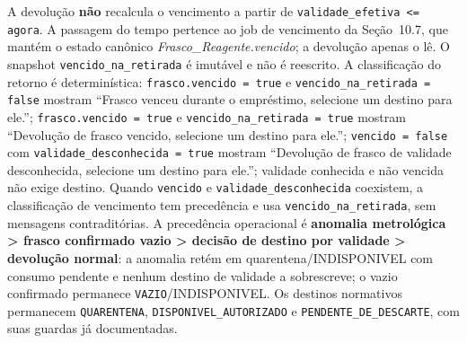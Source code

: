 \begin{regra}
A devolução \textbf{não} recalcula o vencimento a partir de \texttt{validade\_efetiva <= agora}. A passagem do tempo pertence ao job de vencimento da Seção~10.7, que mantém o estado canônico \textit{Frasco\_Reagente.vencido}; a devolução apenas o lê. O snapshot \texttt{vencido\_na\_retirada} é imutável e não é reescrito. A classificação do retorno é determinística: \texttt{frasco.vencido = true} e \texttt{vencido\_na\_retirada = false} mostram ``Frasco venceu durante o empréstimo, selecione um destino para ele.''; \texttt{frasco.vencido = true} e \texttt{vencido\_na\_retirada = true} mostram ``Devolução de frasco vencido, selecione um destino para ele.''; \texttt{vencido = false} com \texttt{validade\_desconhecida = true} mostram ``Devolução de frasco de validade desconhecida, selecione um destino para ele.''; validade conhecida e não vencida não exige destino. Quando \texttt{vencido} e \texttt{validade\_desconhecida} coexistem, a classificação de vencimento tem precedência e usa \texttt{vencido\_na\_retirada}, sem mensagens contraditórias. A precedência operacional é \textbf{anomalia metrológica > frasco confirmado vazio > decisão de destino por validade > devolução normal}: a anomalia retém em quarentena/INDISPONIVEL com consumo pendente e nenhum destino de validade a sobrescreve; o vazio confirmado permanece \texttt{VAZIO}/INDISPONIVEL. Os destinos normativos permanecem \texttt{QUARENTENA}, \texttt{DISPONIVEL\_AUTORIZADO} e \texttt{PENDENTE\_DE\_DESCARTE}, com suas guardas já documentadas.
\end{regra}

